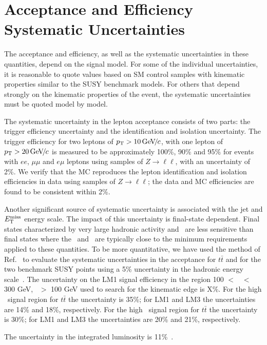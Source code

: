 \section{Acceptance and Efficiency Systematic Uncertainties}
\label{sec:systematics}

The acceptance and efficiency, as well as the systematic uncertainties in these quantities, 
depend on the signal model.
For some of the individual uncertainties, it is reasonable to quote values 
based on SM control samples with kinematic properties similar to the SUSY benchmark models. 
For others that depend strongly on the kinematic properties of the event, the systematic
uncertainties must be quoted model by model.

The systematic uncertainty in the lepton acceptance consists
of two parts: the trigger efficiency uncertainty and the 
identification and isolation uncertainty. The trigger efficiency 
for two leptons of $p_{\mathrm{T}}>10{\,\text{Ge\hspace{-.08em}V\hspace{-0.16em}/\hspace{-0.08em}}c}$, with one lepton of 
$p_{\mathrm{T}}>20{\,\text{Ge\hspace{-.08em}V\hspace{-0.16em}/\hspace{-0.08em}}c}$ is measured to be approximately 100\%, 90\% and 95\%
for events with $ee$, $\mu\mu$ and $e\mu$ leptons using samples of $Z \to \ell\ell$, 
with an uncertainty of 2\%. We verify that the MC reproduces the lepton identification and isolation efficiencies in data using
samples of $Z \to \ell\ell$; the data and MC efficiencies are found to be consistent within 2\%.

Another significant source of systematic uncertainty is 
associated with the jet and $E_{\mathrm{T}}^{\text{miss}}$ energy scale.  The impact
of this uncertainty is final-state dependent.  Final
states characterized by very large hadronic activity and \MET\ are 
less sensitive than final states where the \MET\ and \HT\ 
are typically close to the minimum requirements applied to these quantities.  To be more quantitative,
we have used the method of Ref.~\cite{ref:top} to evaluate
the systematic uncertainties in the acceptance for $t\bar{t}$ 
and for the two benchmark SUSY points using a 5\% uncertainty in the hadronic 
energy scale~\cite{ref:jes}.
The uncertainty on the LM1 signal efficiency in the region 100 $<$ \Ht\ $<$ 300 GeV,
\MET\ $>$ 100 GeV used to search for the kinematic edge is X\%.
For the high \MET\ signal region for $t\bar{t}$ the uncertainty is 35\%; for LM1 and LM3 the 
uncertainties are 14\% and 18\%, respectively.
For the high \Ht\ signal region for $t\bar{t}$ the uncertainty is 30\%; for LM1 and LM3 the 
uncertainties are 20\% and 21\%, respectively.

The uncertainty in the integrated luminosity is 11\%~\cite{ref:lumi}.
